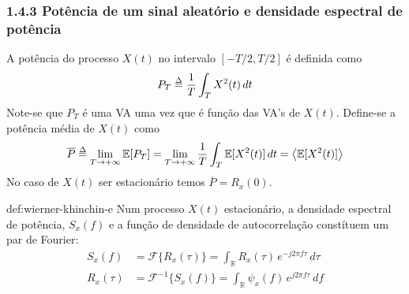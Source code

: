 \subsubsection{1.4.3 Potência de um sinal aleatório e densidade espectral de potência}

A potência do processo $X(t)$ no intervalo $[-T/2, T/2]$ é definida como
$$
    P_T \delequal \frac{1}{T} \int_{T} X^2(t)\, dt
$$
Note-se que $P_T$ é uma VA uma vez que é função das VA's de $X(t)$. Define-se a potência média de $X(t)$ como
$$
    \overline{P} \delequal \lim_{T \to +\infty} \mathbb{E}[P_T] = \lim_{T \to +\infty} \frac{1}{T} \int_{T} \mathbb{E}[X^2(t)]\, dt =
    \left< \mathbb{E}[X^2(t)] \right>
$$
No caso de $X(t)$ ser estacionário temos $\overline{P} = R_x(0)$.

\begin{theo}{def:wierner-khinchin-e}\label{def:wierner-khinchin-e}
    Num processo $X(t)$ estacionário, a densidade espectral de potência, $S_x(f)$ e a função de densidade de autocorrelação constítuem um par de Fourier:
    \begin{align*}
        S_x(f) &= \mathcal{F}\{R_x(\tau)\} = \int_{\mathbb{R}} R_x(\tau)\, e^{-j2\pi f \tau}\, d\tau \\
        R_x(\tau) &= \mathcal{F}^{-1}\{S_x(f)\} = \int_{\mathbb{R}} \psi_x(f)\, e^{j2\pi f \tau}\, df
    \end{align*}
\end{theo}

